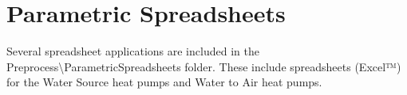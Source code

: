 \chapter{Parametric Spreadsheets}\label{parametric-spreadsheets}

Several spreadsheet applications are included in the Preprocess\textbackslash{}ParametricSpreadsheets folder. These include spreadsheets (Excel™) for the Water Source heat pumps and Water to Air heat pumps.

